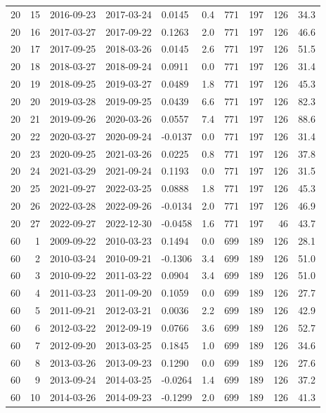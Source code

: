 \documentclass[10pt]{article}
\begin{document}
\begin{longtable}{rrrrlrrrrr}
20 & 15 & 2016-09-23 & 2017-03-24 & 0.0145 & 0.4 & 771 & 197 & 126 & 34.3 \\
20 & 16 & 2017-03-27 & 2017-09-22 & 0.1263 & 2.0 & 771 & 197 & 126 & 46.6 \\
20 & 17 & 2017-09-25 & 2018-03-26 & 0.0145 & 2.6 & 771 & 197 & 126 & 51.5 \\
20 & 18 & 2018-03-27 & 2018-09-24 & 0.0911 & 0.0 & 771 & 197 & 126 & 31.4 \\
20 & 19 & 2018-09-25 & 2019-03-27 & 0.0489 & 1.8 & 771 & 197 & 126 & 45.3 \\
20 & 20 & 2019-03-28 & 2019-09-25 & 0.0439 & 6.6 & 771 & 197 & 126 & 82.3 \\
20 & 21 & 2019-09-26 & 2020-03-26 & 0.0557 & 7.4 & 771 & 197 & 126 & 88.6 \\
20 & 22 & 2020-03-27 & 2020-09-24 & -0.0137 & 0.0 & 771 & 197 & 126 & 31.4 \\
20 & 23 & 2020-09-25 & 2021-03-26 & 0.0225 & 0.8 & 771 & 197 & 126 & 37.8 \\
20 & 24 & 2021-03-29 & 2021-09-24 & 0.1193 & 0.0 & 771 & 197 & 126 & 31.5 \\
20 & 25 & 2021-09-27 & 2022-03-25 & 0.0888 & 1.8 & 771 & 197 & 126 & 45.3 \\
20 & 26 & 2022-03-28 & 2022-09-26 & -0.0134 & 2.0 & 771 & 197 & 126 & 46.9 \\
20 & 27 & 2022-09-27 & 2022-12-30 & -0.0458 & 1.6 & 771 & 197 & 46 & 43.7 \\
60 & 1 & 2009-09-22 & 2010-03-23 & 0.1494 & 0.0 & 699 & 189 & 126 & 28.1 \\
60 & 2 & 2010-03-24 & 2010-09-21 & -0.1306 & 3.4 & 699 & 189 & 126 & 51.0 \\
60 & 3 & 2010-09-22 & 2011-03-22 & 0.0904 & 3.4 & 699 & 189 & 126 & 51.0 \\
60 & 4 & 2011-03-23 & 2011-09-20 & 0.1059 & 0.0 & 699 & 189 & 126 & 27.7 \\
60 & 5 & 2011-09-21 & 2012-03-21 & 0.0036 & 2.2 & 699 & 189 & 126 & 42.9 \\
60 & 6 & 2012-03-22 & 2012-09-19 & 0.0766 & 3.6 & 699 & 189 & 126 & 52.7 \\
60 & 7 & 2012-09-20 & 2013-03-25 & 0.1845 & 1.0 & 699 & 189 & 126 & 34.6 \\
60 & 8 & 2013-03-26 & 2013-09-23 & 0.1290 & 0.0 & 699 & 189 & 126 & 27.6 \\
60 & 9 & 2013-09-24 & 2014-03-25 & -0.0264 & 1.4 & 699 & 189 & 126 & 37.2 \\
60 & 10 & 2014-03-26 & 2014-09-23 & -0.1299 & 2.0 & 699 & 189 & 126 & 41.3 \\

\end{longtable}
\end{document}
